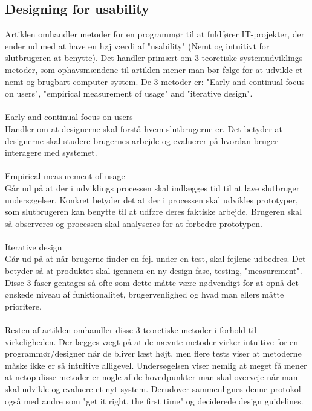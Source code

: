 \documentclass[12pt]{article}
\begin{document}
\subsection{Designing for usability}
Artiklen omhandler metoder for en programmør til at fuldfører IT-projekter, der ender ud med at have en høj værdi af "usability" (Nemt og intuitivt for slutbrugeren at benytte). Det handler primært om 3 teoretiske systemudviklings metoder, som ophavsmændene til artiklen mener man bør følge for at udvikle et nemt og brugbart computer system. De 3 metoder er: "Early and continual focus on users", "empirical measurement of usage" and "iterative design". \\\\
Early and continual focus on users\\
Handler om at designerne skal forstå hvem slutbrugerne er. Det betyder at designerne skal studere brugernes arbejde og evaluerer på hvordan bruger interagere med systemet.\\\\
Empirical measurement of usage\\
Går ud på at der i udviklings processen skal indlægges tid til at lave slutbruger undersøgelser. Konkret betyder det at der i processen skal udvikles prototyper, som slutbrugeren kan benytte til at udføre deres faktiske arbejde. Brugeren skal så observeres og processen skal analyseres for at forbedre prototypen.\\\\
Iterative design\\
Går ud på at når brugerne finder en fejl under en test, skal fejlene udbedres. Det betyder så at produktet skal igennem en ny design fase, testing, "measurement". Disse 3 faser gentages så ofte som dette måtte være nødvendigt for at opnå det ønskede niveau af funktionalitet, brugervenlighed og hvad man ellers måtte prioritere.
\\\\
Resten af artiklen omhandler disse 3 teoretiske metoder i forhold til virkeligheden. Der lægges vægt på at de nævnte metoder virker intuitive for en programmør/designer når de bliver læst højt, men flere tests viser at metoderne måske ikke er så intuitive alligevel. Undersøgelsen viser nemlig at meget få mener at netop disse metoder er nogle af de hovedpunkter man skal overveje når man skal udvikle og evaluere et nyt system. Derudover sammenlignes denne protokol også med andre som "get it right, the first time" og deciderede design guidelines. \\\\
\end{document}
